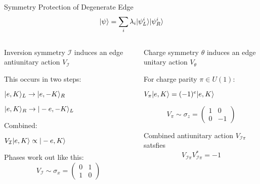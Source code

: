 \begin{frame}{Symmetry Protection of Degenerate Edge}
\vskip-1.5cm
  $$
    \vert \psi \rangle = \sum\limits_i \lambda_i \vert \psi_L^i \rangle \vert \psi_R^i \rangle
  $$
  \begin{columns}[T]
    \begin{column}{0.5\textwidth}
    \vskip-0.5cm
    
    Inversion symmetry $\mathcal{I}$ induces an edge antiunitary action $V_{\mathcal{I}}$ 
    \vskip0.2cm

    This occurs in two steps:
    \bi
    \item $\vert e, K \rangle_L \rightarrow \vert e, -K \rangle_R$
    \item $\vert e, K \rangle_R \rightarrow \vert -e, -K \rangle_L$
    \ei

    Combined:
    \bi
    \item[] $ V_{\mathcal{I}} \vert e, K \rangle 
    \propto \vert -e, K \rangle$
    \ei
  
  Phases work out like this:
  $$ V_{\mathcal{I}} \sim \sigma_x = \begin{pmatrix}
  0 & 1 \\
  1 & 0
 \end{pmatrix} $$

 \end{column}
 \begin{column}{0.5\textwidth}
    \vskip-0.5cm
     Charge symmetry $\mathcal{\theta}$ induces an edge unitary action $V_{\mathcal{\theta}}$

    \vskip0.2cm

     For charge parity $\mathcal{\pi} \in U(1)$:

     \bi
     \item[] $V_{\mathcal{\pi}} \vert e, K \rangle = (-1)^e \vert e, K \rangle $
     \ei

    $$ V_{\mathcal{\pi}} \sim \sigma_z = \begin{pmatrix}
  1 & 0 \\
  0 & -1
 \end{pmatrix} $$

Combined antiunitary action $V_{\mathcal{I \pi}}$ satsfies
\vskip-0.3cm
$$
V_{\mathcal{I \pi}} V_{\mathcal{I \pi}}^* = -1
$$

 \end{column}
\end{columns}

\end{frame}

